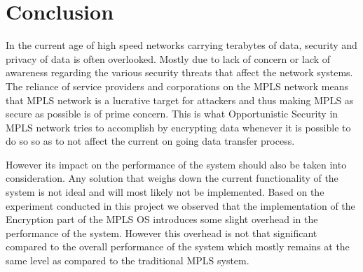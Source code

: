 \chapter{Conclusion}
In the current age of high speed networks carrying terabytes of data, security and privacy of data is often overlooked. Mostly due to lack of concern or lack of awareness regarding the various security threats that affect the network systems. The reliance of service providers and corporations on the MPLS network means that MPLS network is a lucrative target for attackers and thus making MPLS as secure as possible is of prime concern. This is what Opportunistic Security in MPLS network tries to accomplish by encrypting data whenever it is possible to do so so as to not affect the current on going data transfer process.

However its impact on the performance of the system should also be taken into consideration. Any solution that weighs down the current functionality of the system is not ideal and will most likely not be implemented. Based on the experiment conducted in this project we observed that the implementation of the Encryption part of the MPLS OS introduces some slight overhead in the performance of the system. However this overhead is not that significant compared to the overall performance of the system which mostly remains at the same level as compared to the traditional MPLS system.
